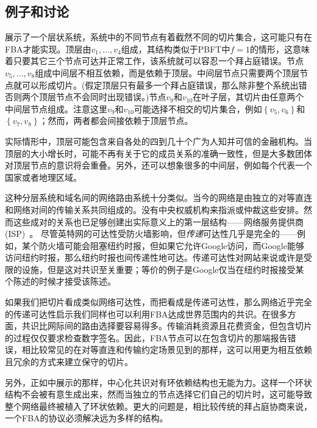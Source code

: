 \subsection{例子和讨论}\label{sec:fba_eg_disscuss}
展示了一个层状系统，系统中的不同节点有着截然不同的切片集合，这可能只有在FBA才能实现。顶层由$v_1,\ldots,v_4$组成，其结构类似于PBFT中$f=1$的情形，这意味着只要其它三个节点可达并正常工作，该系统就可以容忍一个拜占庭错误。节点$v_5,\ldots,v_8$组成中间层不相互依赖，而是依赖于顶层。中间层节点只需要两个顶层节点就可以形成切片。(假定顶层只有最多一个拜占庭错误，那么除非整个系统出错否则两个顶层节点不会同时出现错误。)节点$v_9$和$v_{10}$在叶子层，其切片由任意两个中间层节点组成。注意这里$v_9$和$v_{10}$可能选择不相交的切片集合，例如$\left\{v_5,v_6\right\}$和$\left\{v_7,v_8\right\}$；然而，两者都会间接依赖于顶层节点。

实际情形中，顶层可能包含来自各处的四到几十个广为人知并可信的金融机构。当顶层的大小增长时，可能不再有关于它的成员关系的准确一致性，但是大多数团体对顶层节点的意识将会重叠。另外，还可以想象很多的中间层，例如每个代表一个国家或者地理区域。

这种分层系统和域名间的网络路由系统十分类似。当今的网络是由独立的对等直连和网络对间的传输关系共同组成的。没有中央权威机构来指派或仲裁这些安排。然而这些成对的关系也已足够创建出实际意义上的第一层结构——网络服务提供商(ISP)~\cite{peer_isp2010}。	尽管英特网的可达性受防火墙影响，但\textit{传递}可达性几乎是完全的——例如，某个防火墙可能会阻塞纽约时报，但如果它允许Google访问，而Google能够访问纽约时报，那么纽约时报也间传递性地可达。传递可达性对网站来说或许是受限的设施，但是这对共识至关重要；等价的例子是Google仅当在纽约时报接受某个陈述的时候才接受该陈述。

如果我们把{\quorum}切片看成类似网络可达性，而把{\quorum}看成是传递可达性，那么网络近乎完全的传递可达性启示我们同样也可以利用FBA达成世界范围内的共识。在很多方面，共识比网际间的路由选择要容易得多。传输消耗资源且花费资金，但包含切片的过程仅仅要求检查数字签名。因此，FBA节点可以在包含切片的那端报告错误，相比较常见的在对等直连和传输约定场景见到的那样，这可以用更为相互依赖且冗余的方式来建立保守的切片。

另外，正如中展示的那样，中心化共识对有环依赖结构也无能为力。这样一个环状结构不会被有意生成出来，然而当独立的节点选择它们自己的切片时，这可能导致整个网络最终被植入了环状依赖。更大的问题是，相比较传统的拜占庭协商来说，一个FBA的协议必须解决远为多样的{\quorum}结构。
